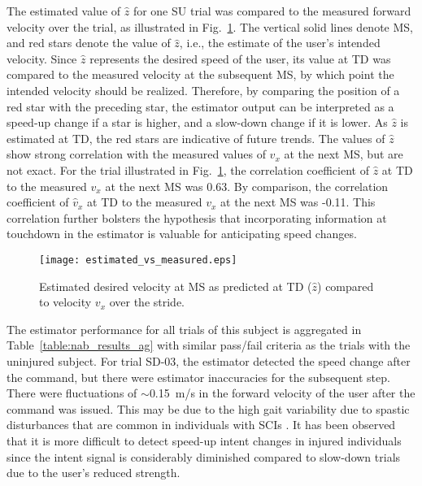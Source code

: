 The estimated value of $ \hat{z} $ for one SU trial was compared to the measured forward velocity over the trial, as illustrated in Fig.~\ref{fig:m_v_e}. The vertical solid lines denote MS, and red stars denote the value of $ \hat{z} $, i.e., the estimate of the user's intended velocity. Since $\hat{z}$ represents the desired speed of the user, its value at TD was compared to the measured velocity at the subsequent MS, by which point the intended velocity should be realized. Therefore, by comparing the position of a red star with the preceding star, the estimator output can be interpreted as a speed-up change if a star is higher, and a slow-down change if it is lower. As $ \hat{z} $ is estimated at TD, the red stars are indicative of future trends. The values of $ \hat{z} $ show strong correlation with the measured values of $v_x$ at the next MS, but are not exact. For the trial illustrated in Fig.~\ref{fig:m_v_e}, the correlation coefficient of $ \hat{z} $ at TD to the measured $ v_x $ at the next MS was 0.63. By comparison, the correlation coefficient of $ \hat{v}_x $ at TD to the measured $ v_x $ at the next MS was -0.11. This correlation further bolsters the hypothesis that incorporating information at touchdown in the estimator is valuable for anticipating speed changes.

\begin{figure}
	\centering
	\texttt{[image: estimated\_vs\_measured.eps]}
	\caption{Estimated desired velocity at MS as predicted at TD ($\hat{z}$) compared to velocity $v_x$ over the stride.} \label{fig:m_v_e}
\end{figure}

The estimator performance for all trials of this subject is aggregated in Table~\ref{table:nab_results_ag} with similar pass/fail criteria as the trials with the uninjured subject. For trial SD-03, the estimator detected the speed change after the command, but there were estimator inaccuracies for the subsequent step. There were fluctuations of $ \sim $0.15~m/s in the forward velocity of the user after the command was issued. This may be due to the high gait variability due to spastic disturbances that are common in individuals with SCIs \cite{malhotra2009spasticity}. It has been observed that it is more difficult to detect speed-up intent changes in injured individuals since the intent signal is considerably diminished compared to slow-down trials \cite{gambon2020effects} due to the user's reduced strength.




